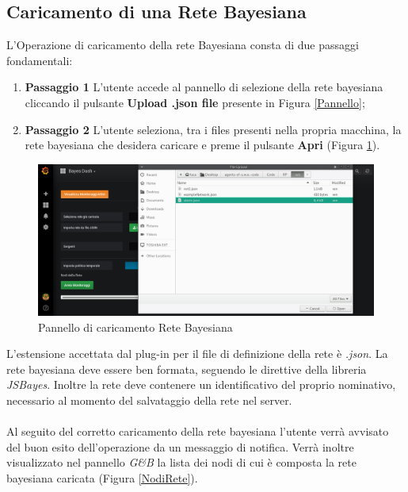 \subsection{Caricamento di una Rete Bayesiana}\label{ReteB}

L'Operazione di caricamento della rete Bayesiana consta di due passaggi fondamentali:
\begin{enumerate}
	\item \textbf{Passaggio 1} L'utente accede al pannello di selezione della rete bayesiana cliccando il pulsante \textbf{Upload .json file} presente in Figura \ref{Pannello};
	\item \textbf{Passaggio 2} L'utente seleziona, tra i files presenti nella propria macchina, la rete bayesiana che desidera caricare e preme il pulsante \textbf{Apri} (Figura \ref{UploadRete}).
\end{enumerate} 

\begin{figure}[H]
	\begin{center}
		\includegraphics[scale=0.3]{./images/UpRete.png}
		 \caption{Pannello di caricamento Rete Bayesiana}	
		 \label{UploadRete}
	\end{center}
\end{figure}

L'estensione accettata dal plug-in per il file di definizione della rete è \textit{.json}. La rete bayesiana deve essere ben formata, seguendo le direttive della libreria \textit{JSBayes}. Inoltre la rete deve contenere un identificativo del proprio nominativo, necessario al momento del salvataggio della rete nel server.\\
~\\
Al seguito del corretto caricamento della rete bayesiana l'utente verrà avvisato del buon esito dell'operazione da un messaggio di notifica. Verrà inoltre visualizzato nel pannello \textit{G\&B} la lista dei nodi di cui è composta la rete bayesiana caricata (Figura \ref{NodiRete}).

